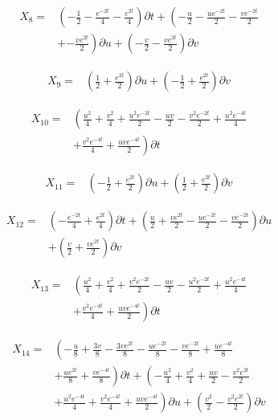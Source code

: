 \begin{align*}
X_{8}=&\left(- \frac{1}{2}- \frac{e^{- 2 t}}{4}- \frac{e^{2 t}}{4} \right)\partial t+\left(- \frac{u}{2}- \frac{u e^{- 2 t}}{2}- \frac{v e^{- 2 t}}{2}\right.\\
&+\left.- \frac{v e^{2 t}}{2} \right)\partial u+\left(- \frac{v}{2}- \frac{v e^{2 t}}{2} \right)\partial v
\end{align*}

\begin{align*}
X_{9}=&\left(\frac{1}{2}+\frac{e^{2 t}}{2} \right)\partial u+\left(- \frac{1}{2}+\frac{e^{2 t}}{2} \right)\partial v
\end{align*}

\begin{align*}
X_{10}=&\left(\frac{u^{2}}{4}+\frac{v^{2}}{4}+\frac{u^{2} e^{- 2 t}}{2}- \frac{u v}{2}- \frac{v^{2} e^{- 2 t}}{2}+\frac{u^{2} e^{- 4 t}}{4}\right.\\
&+\left.\frac{v^{2} e^{- 4 t}}{4}+\frac{u v e^{- 4 t}}{2} \right)\partial t
\end{align*}

\begin{align*}
X_{11}=&\left(- \frac{1}{2}+\frac{e^{2 t}}{2} \right)\partial u+\left(\frac{1}{2}+\frac{e^{2 t}}{2} \right)\partial v
\end{align*}

\begin{align*}
X_{12}=&\left(- \frac{e^{- 2 t}}{4}+\frac{e^{2 t}}{4} \right)\partial t+\left(\frac{u}{2}+\frac{v e^{2 t}}{2}- \frac{u e^{- 2 t}}{2}- \frac{v e^{- 2 t}}{2} \right)\partial u\\
&+\left(\frac{v}{2}+\frac{v e^{2 t}}{2} \right)\partial v
\end{align*}

\begin{align*}
X_{13}=&\left(\frac{u^{2}}{4}+\frac{v^{2}}{4}+\frac{v^{2} e^{- 2 t}}{2}- \frac{u v}{2}- \frac{u^{2} e^{- 2 t}}{2}+\frac{u^{2} e^{- 4 t}}{4}\right.\\
&+\left.\frac{v^{2} e^{- 4 t}}{4}+\frac{u v e^{- 4 t}}{2} \right)\partial t
\end{align*}

\begin{align*}
X_{14}=&\left(- \frac{u}{8}+\frac{3 v}{8}- \frac{3 v e^{2 t}}{8}- \frac{u e^{- 2 t}}{8}- \frac{v e^{- 2 t}}{8}+\frac{u e^{- 4 t}}{8}\right.\\
&+\left.\frac{u e^{2 t}}{8}+\frac{v e^{- 4 t}}{8} \right)\partial t+\left(- \frac{u^{2}}{4}+\frac{v^{2}}{4}+\frac{u v}{2}- \frac{v^{2} e^{2 t}}{2}\right.\\
&+\left.\frac{u^{2} e^{- 4 t}}{4}+\frac{v^{2} e^{- 4 t}}{4}+\frac{u v e^{- 4 t}}{2} \right)\partial u+\left(\frac{v^{2}}{2}- \frac{v^{2} e^{2 t}}{2} \right)\partial v
\end{align*}

